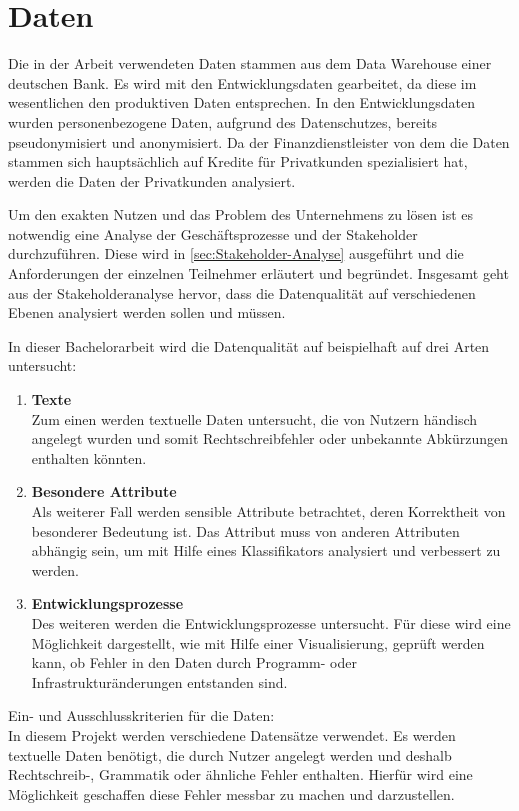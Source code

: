 \chapter{Daten}\label{ch:data}
Die in der Arbeit verwendeten Daten stammen aus dem Data Warehouse einer deutschen Bank.
Es wird mit den Entwicklungsdaten gearbeitet, da diese im wesentlichen den produktiven Daten entsprechen.
In den Entwicklungsdaten wurden personenbezogene Daten, aufgrund des Datenschutzes, bereits pseudonymisiert und anonymisiert.
Da der Finanzdienstleister von dem die Daten stammen sich hauptsächlich auf Kredite für Privatkunden spezialisiert hat, werden die Daten der Privatkunden analysiert.

Um den exakten Nutzen und das Problem des Unternehmens zu lösen ist es notwendig eine Analyse der Geschäftsprozesse und der Stakeholder durchzuführen. 
Diese wird in \autoref{sec:Stakeholder-Analyse} ausgeführt und die Anforderungen der einzelnen Teilnehmer erläutert und begründet.
Insgesamt geht aus der Stakeholderanalyse hervor, dass die Datenqualität auf verschiedenen Ebenen analysiert werden sollen und müssen. 

In dieser Bachelorarbeit wird die Datenqualität auf beispielhaft auf drei Arten untersucht:
\begin{enumerate}
 \item \textbf{Texte} \\
 Zum einen werden textuelle Daten untersucht, die von Nutzern händisch angelegt wurden und somit Rechtschreibfehler oder unbekannte Abkürzungen enthalten könnten. 
 \item \textbf{Besondere Attribute} \\
 Als weiterer Fall werden sensible Attribute betrachtet, deren Korrektheit von besonderer Bedeutung ist. Das Attribut muss von anderen Attributen abhängig sein, um mit Hilfe eines Klassifikators analysiert und verbessert zu werden.  %
 \item \textbf{Entwicklungsprozesse} \\
 Des weiteren werden die Entwicklungsprozesse untersucht. Für diese wird eine Möglichkeit dargestellt, wie mit Hilfe einer Visualisierung, geprüft werden kann, ob Fehler in den Daten durch Programm- oder Infrastrukturänderungen entstanden sind. 
\end{enumerate}



Ein- und Ausschlusskriterien für die Daten:\\
In diesem Projekt werden verschiedene Datensätze verwendet. 
Es werden textuelle Daten benötigt, die durch Nutzer angelegt werden und deshalb Rechtschreib-, Grammatik oder ähnliche Fehler enthalten. 
Hierfür wird eine Möglichkeit geschaffen diese Fehler messbar zu machen und darzustellen. \\ 

